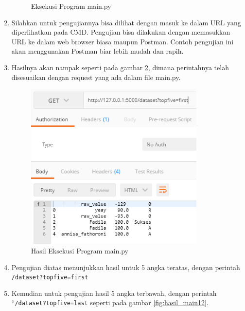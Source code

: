 \begin{enumerate}
\begin{figure}[!htbp]
	\caption{Eksekusi Program main.py}
	\label{fig:eksekusi_fungsi15}
\end{figure}
\item Silahkan untuk pengujiannya bisa dilihat dengan masuk ke dalam URL yang diperlihatkan pada CMD. Pengujian bisa dilakukan dengan memasukkan URL ke dalam web browser biasa maupun Postman. Contoh pengujian ini akan menggunakan Postman biar lebih mudah dan rapih.
\item Hasilnya akan nampak seperti pada gambar \ref{fig:hasil_main}, dimana perintahnya telah disesuaikan dengan request yang ada dalam file main.py.
\begin{figure}[!htbp]
	\centerline{\includegraphics[width=0.85\textwidth]{figures/8/hasil_main.png}}
	\caption{Hasil Eksekusi Program main.py}
	\label{fig:hasil_main}
\end{figure}
\item Pengujian diatas menunjukkan hasil untuk 5 angka teratas, dengan perintah \verb|/dataset?topfive=first|
\item Kemudian untuk pengujian hasil 5 angka terbawah, dengan perintah “\verb|/dataset?topfive=last| seperti pada gambar \ref{fig:hasil_main12}.
\begin{figure}[!htbp]

\end{figure}
\end{enumerate}
